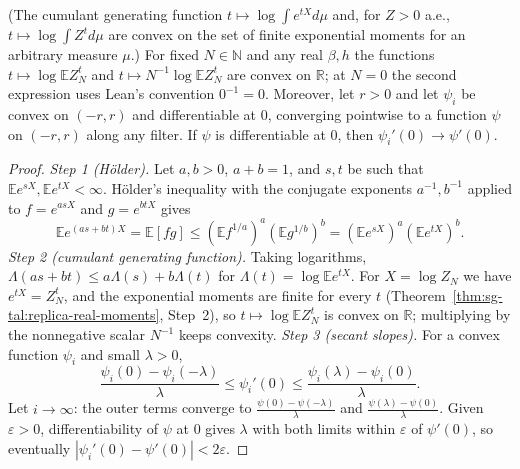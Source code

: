 \begin{theorem}\label{thm:sg-tal:replica-convexity}
\leanok
{}
(The cumulant generating function $t\mapsto\log\int e^{tX}d\mu$ and, for $Z>0$ a.e., $t\mapsto\log\int Z^td\mu$ are
convex on the set of finite exponential moments for an arbitrary measure $\mu$.)
For fixed $N\in\mathbb N$ and any real $\beta,h$ the functions $t\mapsto\log\mathbb EZ_N^t$ and $t\mapsto N^{-1}\log\mathbb EZ_N^t$ are convex on $\mathbb R$; at $N=0$ the second expression uses Lean's convention $0^{-1}=0$.
Moreover, let $r>0$ and let $\psi_i$ be convex on $(-r,r)$ and differentiable at $0$, converging pointwise to a function $\psi$ on $(-r,r)$ along any filter. If $\psi$ is differentiable at $0$, then $\psi_i'(0)\to\psi'(0)$.
\end{theorem}
\begin{proof}
\leanok
\emph{Step 1 (H\"older).} Let $a,b>0$, $a+b=1$, and $s,t$ be such that $\mathbb Ee^{sX},\mathbb Ee^{tX}<\infty$. H\"older's inequality with the conjugate exponents $a^{-1},b^{-1}$ applied to $f=e^{asX}$ and $g=e^{btX}$ gives
\[
\mathbb Ee^{(as+bt)X}=\mathbb E[fg]\le(\mathbb Ef^{1/a})^{a}(\mathbb Eg^{1/b})^{b}=(\mathbb Ee^{sX})^a(\mathbb Ee^{tX})^b .
\]
\emph{Step 2 (cumulant generating function).} Taking logarithms, $\Lambda(as+bt)\le a\Lambda(s)+b\Lambda(t)$ for $\Lambda(t)=\log\mathbb Ee^{tX}$. For $X=\log Z_N$ we have $e^{tX}=Z_N^t$, and the exponential moments are finite for every $t$ (Theorem~\ref{thm:sg-tal:replica-real-moments}, Step~2), so $t\mapsto\log\mathbb EZ_N^t$ is convex on $\mathbb R$; multiplying by the nonnegative scalar $N^{-1}$ keeps convexity.
\emph{Step 3 (secant slopes).} For a convex function $\psi_i$ and small $\lambda>0$,
\[
\frac{\psi_i(0)-\psi_i(-\lambda)}{\lambda}\le\psi_i'(0)\le\frac{\psi_i(\lambda)-\psi_i(0)}{\lambda}.
\]
Let $i\to\infty$: the outer terms converge to $\frac{\psi(0)-\psi(-\lambda)}\lambda$ and $\frac{\psi(\lambda)-\psi(0)}\lambda$. Given $\varepsilon>0$, differentiability of $\psi$ at $0$ gives $\lambda$ with both limits within $\varepsilon$ of $\psi'(0)$, so eventually $|\psi_i'(0)-\psi'(0)|<2\varepsilon$.
\end{proof}

